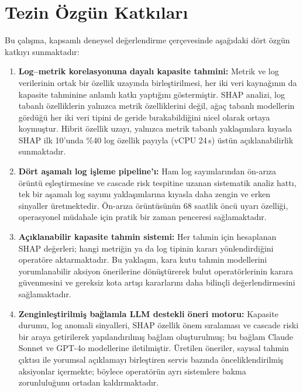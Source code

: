 \section{Tezin Özgün Katkıları}
\label{sec:sonuc-katkilar}

Bu çalışma, kapsamlı deneysel değerlendirme çerçevesinde aşağıdaki dört özgün katkıyı sunmaktadır:

\begin{enumerate}
    \item \textbf{Log--metrik korelasyonuna dayalı kapasite tahmini:}
    Metrik ve log verilerinin ortak bir özellik uzayında birleştirilmesi, her iki veri kaynağının da kapasite tahminine anlamlı katkı yaptığını göstermiştir.
    SHAP analizi, log tabanlı özelliklerin yalnızca metrik özelliklerini değil, ağaç tabanlı modellerin gördüğü her iki veri tipini de geride bırakabildiğini nicel olarak ortaya koymuştur.
    Hibrit özellik uzayı, yalnızca metrik tabanlı yaklaşımlara kıyasla SHAP ilk 10'unda \%40 log özellik payıyla (vCPU 24\,s) üstün açıklanabilirlik sunmaktadır.

    \item \textbf{Dört aşamalı log işleme pipeline'ı:}
    Ham log sayımlarından ön-arıza örüntü eşleştirmesine ve cascade risk tespitine uzanan sistematik analiz hattı, tek bir aşamalı log sayımı yaklaşımlarına kıyasla daha zengin ve erken sinyaller üretmektedir.
    Ön-arıza örüntüsünün 68 saatlik öncü uyarı özelliği, operasyonel müdahale için pratik bir zaman penceresi sağlamaktadır.

    \item \textbf{Açıklanabilir kapasite tahmin sistemi:}
    Her tahmin için hesaplanan SHAP değerleri; hangi metriğin ya da log tipinin kararı yönlendirdiğini operatöre aktarmaktadır.
    Bu yaklaşım, kara kutu tahmin modellerini yorumlanabilir aksiyon önerilerine dönüştürerek bulut operatörlerinin karara güvenmesini ve gereksiz kota artışı kararlarını daha bilinçli değerlendirmesini sağlamaktadır.

    \item \textbf{Zenginleştirilmiş bağlamla LLM destekli öneri motoru:}
    Kapasite durumu, log anomali sinyalleri, SHAP özellik önem sıralaması ve cascade riski bir araya getirilerek yapılandırılmış bağlam oluşturulmuş; bu bağlam Claude Sonnet ve GPT-4o modellerine iletilmiştir.
    Üretilen öneriler, sayısal tahmin çıktısı ile yorumsal açıklamayı birleştiren servis bazında önceliklendirilmiş aksiyonlar içermekte; böylece operatörün ayrı sistemlere bakma zorunluluğunu ortadan kaldırmaktadır.
\end{enumerate}


